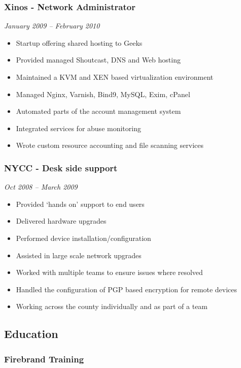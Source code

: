 \subsubsection{Xinos - Network Administrator}

\emph{January 2009 -- February 2010}

\begin{itemize}
\item
  Startup offering shared hosting to Geeks
\item
  Provided managed Shoutcast, DNS and Web hosting
\item
  Maintained a KVM and XEN based virtualization environment
\item
  Managed Nginx, Varnish, Bind9, MySQL, Exim, cPanel
\item
  Automated parts of the account management system
\item
  Integrated services for abuse monitoring
\item
  Wrote custom resource accounting and file scanning services
\end{itemize}
\subsubsection{NYCC - Desk side support}

\emph{Oct 2008 -- March 2009}

\begin{itemize}
\item
  Provided `hands on' support to end users
\item
  Delivered hardware upgrades
\item
  Performed device installation/configuration
\item
  Assisted in large scale network upgrades
\item
  Worked with multiple teams to ensure issues where resolved
\item
  Handled the configuration of PGP based encryption for remote devices
\item
  Working across the county individually and as part of a team
\end{itemize}
\subsection{Education}

\subsubsection{Firebrand Training}

